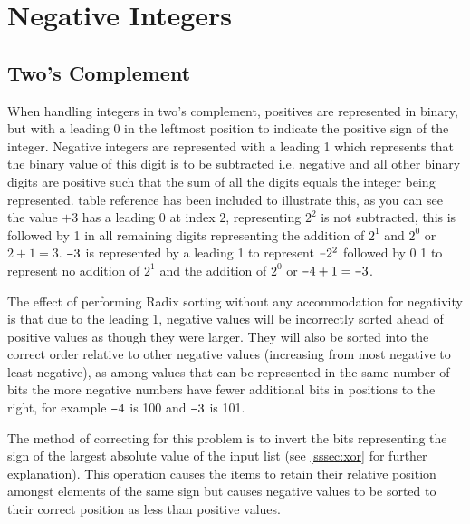 \documentclass[12pt]{article}
\newcommand{\minus}{\scalebox{0.75}[1.0]{$-$}}
\begin{document}
	\section{Negative Integers}
	\subsection{Two's Complement}
	\label{ssec:negativestwos}
	When handling integers in two’s complement, positives are represented in binary, but with a leading 0 in the leftmost position to indicate the positive sign of the integer. Negative integers are represented with a leading 1 which represents that the binary value of this digit is to be subtracted i.e. negative and all other binary digits are positive such that the sum of all the digits equals the integer being represented. table reference has been included to illustrate this, as you can see the value $+3$ has a leading $0$ at index $2$, representing $2^{2}$ is not subtracted, this is followed by 1 in all remaining digits representing the addition of $2^{1}$ and $2^{0}$ or $2+1=3$. $\minus3$ is represented by a leading 1 to represent $\minus2^{2}$ followed by 0 1 to represent no addition of $2^{1}$ and the addition of $2^{0}$ or $\minus4 + 1 = \minus3$.
	\par
	The effect of performing Radix sorting without any accommodation for negativity is that due to the leading 1, negative values will be incorrectly sorted ahead of positive values as though they were larger. They will also be sorted into the correct order relative to other negative values (increasing from most negative to least negative), as among values that can be represented in the same number of bits the more negative numbers have fewer additional bits in positions to the right, for example $\minus4$ is 100 and $\minus 3$ is 101.
	\par
	The method of correcting for this problem is to invert the bits representing the sign of the largest absolute value of the input list (see \ref{sssec:xor} for further explanation). This operation causes the items to retain their relative position amongst elements of the same sign but causes negative values to be sorted to their correct position as less than positive values.
	\vspace{1cm}
\end{document}
